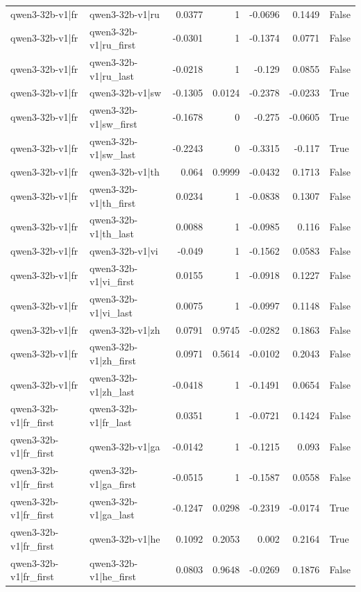 \begin{table}
\begin{tabular}{l l r r r r l}
qwen3-32b-v1|fr & qwen3-32b-v1|ru & 0.0377 & 1 & -0.0696 & 0.1449 & False \\
qwen3-32b-v1|fr & qwen3-32b-v1|ru_first & -0.0301 & 1 & -0.1374 & 0.0771 & False \\
qwen3-32b-v1|fr & qwen3-32b-v1|ru_last & -0.0218 & 1 & -0.129 & 0.0855 & False \\
qwen3-32b-v1|fr & qwen3-32b-v1|sw & -0.1305 & 0.0124 & -0.2378 & -0.0233 & True \\
qwen3-32b-v1|fr & qwen3-32b-v1|sw_first & -0.1678 & 0 & -0.275 & -0.0605 & True \\
qwen3-32b-v1|fr & qwen3-32b-v1|sw_last & -0.2243 & 0 & -0.3315 & -0.117 & True \\
qwen3-32b-v1|fr & qwen3-32b-v1|th & 0.064 & 0.9999 & -0.0432 & 0.1713 & False \\
qwen3-32b-v1|fr & qwen3-32b-v1|th_first & 0.0234 & 1 & -0.0838 & 0.1307 & False \\
qwen3-32b-v1|fr & qwen3-32b-v1|th_last & 0.0088 & 1 & -0.0985 & 0.116 & False \\
qwen3-32b-v1|fr & qwen3-32b-v1|vi & -0.049 & 1 & -0.1562 & 0.0583 & False \\
qwen3-32b-v1|fr & qwen3-32b-v1|vi_first & 0.0155 & 1 & -0.0918 & 0.1227 & False \\
qwen3-32b-v1|fr & qwen3-32b-v1|vi_last & 0.0075 & 1 & -0.0997 & 0.1148 & False \\
qwen3-32b-v1|fr & qwen3-32b-v1|zh & 0.0791 & 0.9745 & -0.0282 & 0.1863 & False \\
qwen3-32b-v1|fr & qwen3-32b-v1|zh_first & 0.0971 & 0.5614 & -0.0102 & 0.2043 & False \\
qwen3-32b-v1|fr & qwen3-32b-v1|zh_last & -0.0418 & 1 & -0.1491 & 0.0654 & False \\
qwen3-32b-v1|fr_first & qwen3-32b-v1|fr_last & 0.0351 & 1 & -0.0721 & 0.1424 & False \\
qwen3-32b-v1|fr_first & qwen3-32b-v1|ga & -0.0142 & 1 & -0.1215 & 0.093 & False \\
qwen3-32b-v1|fr_first & qwen3-32b-v1|ga_first & -0.0515 & 1 & -0.1587 & 0.0558 & False \\
qwen3-32b-v1|fr_first & qwen3-32b-v1|ga_last & -0.1247 & 0.0298 & -0.2319 & -0.0174 & True \\
qwen3-32b-v1|fr_first & qwen3-32b-v1|he & 0.1092 & 0.2053 & 0.002 & 0.2164 & True \\
qwen3-32b-v1|fr_first & qwen3-32b-v1|he_first & 0.0803 & 0.9648 & -0.0269 & 0.1876 & False \\

\end{tabular}
\end{table}
